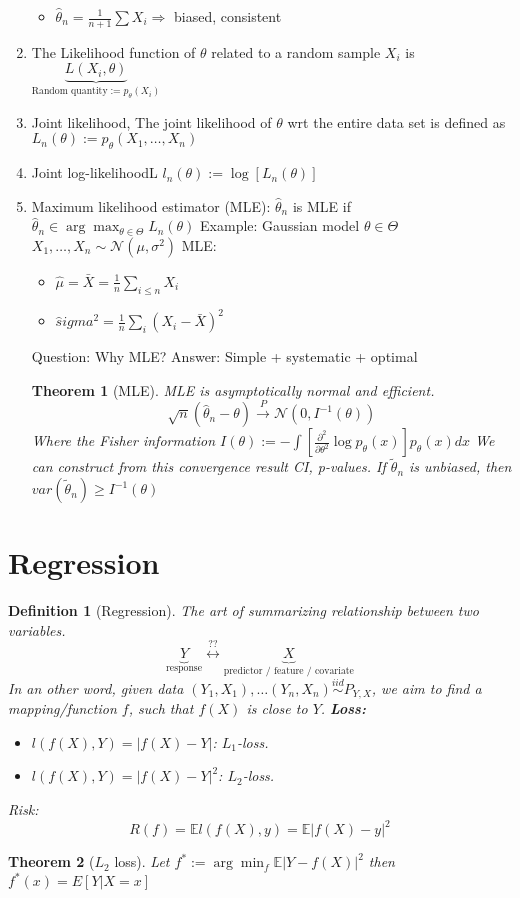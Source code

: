 \documentclass{article}
\newtheorem{theorem}{Theorem}
\newtheorem{definition}{Definition}
\begin{document}
\begin{enumerate}
\begin{itemize}
  \item $\hat \theta_n = \frac{1}{n+1}\sum X_i \Rightarrow $ biased, consistent
  \end{itemize}
\item The Likelihood function of $\theta$ related to a random sample $X_i$ is $\underbrace{L(X_i, \theta)}_{\text{Random quantity} := p_{\theta}(X_i)}$
\item Joint likelihood, The joint likelihood of $\theta$ wrt the entire data set is defined as $L_n(\theta) := p_{\theta}(X_1, \ldots, X_n)$
\item Joint log-likelihoodL $l_n(\theta) := \log[L_n(\theta)]$
\item Maximum likelihood estimator (MLE):
  $\hat \theta_n$ is MLE if $\hat \theta_n \in \arg\max_{\theta \in \Theta} L_n(\theta)$
  Example: Gaussian model $\theta \in \Theta$
  $X_1, \ldots, X_n \sim \mathcal N(\mu, \sigma^2)$
  MLE:
  \begin{itemize}
  \item $\hat \mu = \bar X = \frac1n \sum_{i \le n} X_i$
  \item $\hat sigma^2 = \frac1n \sum_i (X_i - \bar X)^2$
  \end{itemize}
  Question: Why MLE?
  Answer: Simple + systematic + optimal
  \begin{theorem}[MLE]
    MLE is asymptotically normal and \textit{efficient}.
    $$\sqrt n(\hat \theta_n - \theta) \overset{P}{\rightarrow} \mathcal N(0, I^{-1}(\theta))$$
    Where the Fisher information $I(\theta) :=  - \int [\frac{\partial^2}{\partial \theta^2}\log p_{\theta}(x)] p_{\theta}(x) dx$
    We can construct from this convergence result CI, p-values.
    If $\tilde \theta_n$ is unbiased, then $var(\tilde \theta_n) \ge I^{-1}(\theta)$
  \end{theorem}
\end{enumerate}

\section{Regression}
\begin{definition}[Regression]
  The art of summarizing relationship between two variables.
  $$\underbrace{Y}_{\text{response}} \overset{??}{\leftrightarrow} \underbrace{X}_{\text{predictor / feature / covariate}}$$
  In an other word, given data $(Y_1, X_1), \ldots (Y_n, X_n) \overset{iid}\sim P_{Y, X}$, we aim to find a mapping/function $f$, such that $f(X)$ is \textit{close} to $Y$.
  \textbf{Loss:}
  \begin{itemize}
  \item $l(f(X), Y) = |f(X) - Y|$: $L_1$-loss.
  \item $l(f(X), Y) = |f(X) - Y|^2$: $L_2$-loss.
  \end{itemize}
  Risk:
  $$R(f) = \mathbb E l(f(X), y) = \mathbb E |f(X) - y|^2$$
\end{definition}
\begin{theorem}[$L_2$ loss]
  Let $f^* := \arg \min_f \mathbb E |Y - f(X)|^2$ then $f^*(x) = E[Y | X = x]$
\end{theorem}
\end{document}
